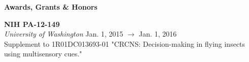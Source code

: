 \documentclass[a4paper,12pt]{article}
\newcommand{\resheading}[1]{{\vspace*{.06in} \colorbox{mygrey}{\begin{minipage}{\textwidth}{\textmd{\large \textbf{#1} \vphantom{p\^{E}}}}\end{minipage}}} }
\newcommand{\ressubheading}[4]{
        \textbf{#1} \hfill #2\\
        \textit{#3} \hfill #4 \\}
\begin{document}
        

        
        
\resheading{Awards, Grants \& Honors}
        
    \ressubheading{NIH PA-12-149}{}{University of Washington}{Jan. 1, 2015 $\rightarrow$ Jan. 1, 2016}
    Supplement to 1R01DC013693-01 "CRCNS: Decision-making in flying insects using multisensory cues."\\
    
\end{document}
